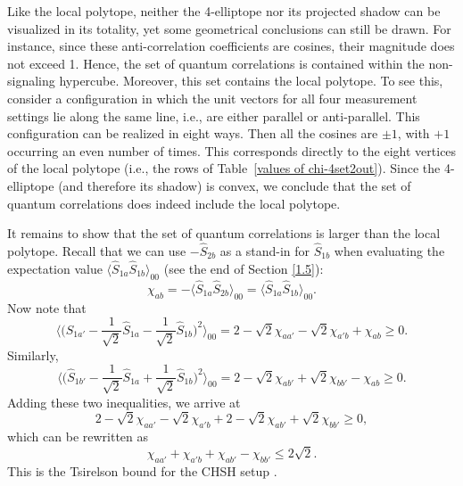 Like the local polytope, neither the 4-elliptope nor its projected shadow can be visualized in its totality, yet some geometrical conclusions can still be drawn. For instance, since these  anti-correlation coefficients are cosines, their magnitude does not exceed 1. Hence, the set of quantum correlations is contained within the non-signaling hypercube. Moreover, this set contains the local polytope. To see this, consider a configuration in which the unit vectors for all four measurement settings lie along the same line, i.e., are either parallel or anti-parallel. This configuration can be realized in eight ways. Then all the cosines are $\pm 1$, with $+1$ occurring an even number of times. This corresponds directly to the eight vertices of the local polytope (i.e., the rows of Table\ \ref{values of chi-4set2out}). Since the 4-elliptope (and therefore its shadow) is convex, we conclude that the set of quantum correlations does indeed include the local polytope.

It remains to show that the set of quantum correlations is larger than the local polytope. Recall that we can use $-\hat{S}_{2b}$ as a stand-in for $\hat{S}_{1b}$ when evaluating the expectation value $ \langle \hat{S}_{1a}\hat{S}_{1b}\rangle_{00}$ (see the end of  Section \ref{1.5}):
\begin{equation}
\chi_{ab} =-\langle \hat{S}_{1a}\hat{S}_{2b}\rangle_{00} = \langle \hat{S}_{1a}\hat{S}_{1b}\rangle_{00}.
\end{equation}
Now note that
\begin{equation}
\Big\langle \Big(\hat{S}_{1a'}-\frac{1}{\sqrt{2}}\hat{S}_{1a}-\frac{1}{\sqrt{2}}\hat{S}_{1b}\Big)^{\!2}\Big\rangle_{00}
= 2-\sqrt{2}\chi_{aa'}-\sqrt{2}\chi_{a'b}+\chi_{ab}\geq 0.
\label{CHSH-Tsirelson 1}
\end{equation}
Similarly,
\begin{equation}
\Big\langle \Big( \hat{S}_{1b'}-\frac{1}{\sqrt{2}}\hat{S}_{1a}+\frac{1}{\sqrt{2}}\hat{S}_{1b} \Big)^{\!2} \Big\rangle_{00}
= 2-\sqrt{2}\chi_{ab'}+\sqrt{2}\chi_{bb'}-\chi_{ab}\geq 0.
\label{CHSH-Tsirelson 2}
\end{equation}
Adding these two inequalities, we arrive at
\begin{equation}
2-\sqrt{2}\chi_{aa'}-\sqrt{2}\chi_{a'b} + 2-\sqrt{2}\chi_{ab'}+\sqrt{2}\chi_{bb'} \geq 0,
\label{CHSH-Tsirelson 3}
\end{equation}
which can be rewritten as
\begin{equation}
\chi_{aa'}+\chi_{a'b}+\chi_{ab'}-\chi_{bb'} \leq 2\sqrt{2}.
\label{CHSH-Tsirelson 4}
\end{equation}
This is the Tsirelson bound for the CHSH setup \citep[p.\ 68]{Bub 2016}. 


